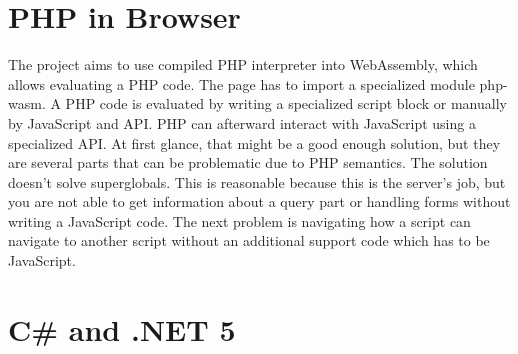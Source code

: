 \section{PHP in Browser}

The project  aims to use compiled PHP interpreter into WebAssembly, which allows evaluating a PHP code.
The page has to import a specialized module php-wasm. 
A PHP code is evaluated by writing a specialized script block or manually by JavaScript and API.
PHP can afterward interact with JavaScript using a specialized API.
At first glance, that might be a good enough solution, but they are several parts that can be problematic due to PHP semantics.
The solution doesn't solve superglobals. 
This is reasonable because this is the server's job, but you are not able to get information about a query part or handling forms without writing a JavaScript code.
The next problem is navigating how a script can navigate to another script without an additional support code which has to be JavaScript.

\section{C\# and .NET 5}

